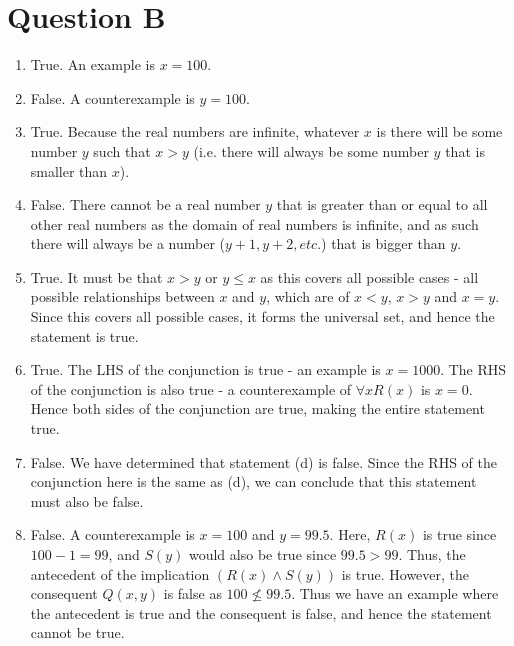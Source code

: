 \documentclass[a4paper]{article}
\begin{document}
\section{Question B}

\renewcommand{\labelenumi}{(\alph{enumi})}

\begin{enumerate}
\item True. An example is \(x = 100\).\\
\item False. A counterexample is \(y = 100\). \\
\item True. Because the real numbers are infinite, whatever \(x\) is there will be some number \(y\) such that \(x > y\) (i.e. there will always be some number \(y\) that is smaller than \(x\)).\\
\item False. There cannot be a real number \(y\) that is greater than or equal to all other real numbers as the domain of real numbers is infinite, and as such there will always be a number (\(y+1, y+2, etc.\)) that is bigger than \(y\).\\
\item True. It must be that \(x > y\) or \(y \leq x\) as this covers all possible cases - all possible relationships between \(x\) and \(y\), which are of \(x < y\), \(x > y\) and \(x = y\). Since this covers all possible cases, it forms the universal set, and hence the statement is true.\\
\item True. The LHS of the conjunction is true - an example is \( x = 1000\). The RHS of the conjunction is also true - a counterexample of \( \forall xR(x)\) is \(x = 0\). Hence both sides of the conjunction are true, making the entire statement true.\\
\item False. We have determined that statement (d) is false. Since the RHS of the conjunction here is the same as (d), we can conclude that this statement must also be false.\\
\item False. A counterexample is \(x = 100\) and \(y = 99.5\). Here, \(R(x)\) is true since \(100 - 1 = 99\), and \(S(y)\) would also be true since \(99.5 > 99\). Thus, the antecedent of the implication \((R(x) \wedge S(y))\) is true. However, the consequent \(Q(x,y)\) is false as \(100 \nleq 99.5\). Thus we have an example where the antecedent is true and the consequent is false, and hence the statement cannot be true.
\end{enumerate}
\end{document}
